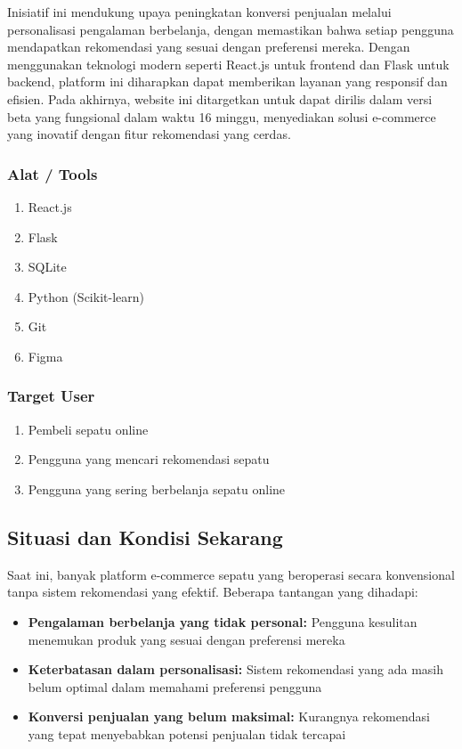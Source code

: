 \documentclass[journal,article,submit,pdftex,moreauthors]{Definitions/mdpi}
\begin{document}
Inisiatif ini mendukung upaya peningkatan konversi penjualan melalui personalisasi pengalaman berbelanja, dengan memastikan bahwa setiap pengguna mendapatkan rekomendasi yang sesuai dengan preferensi mereka. Dengan menggunakan teknologi modern seperti React.js untuk frontend dan Flask untuk backend, platform ini diharapkan dapat memberikan layanan yang responsif dan efisien. Pada akhirnya, website ini ditargetkan untuk dapat dirilis dalam versi beta yang fungsional dalam waktu 16 minggu, menyediakan solusi e-commerce yang inovatif dengan fitur rekomendasi yang cerdas.

\subsubsection{Alat / Tools}
\begin{enumerate}[left=2em]
    \item React.js
    \item Flask
    \item SQLite
    \item Python (Scikit-learn)
    \item Git
    \item Figma
\end{enumerate}

\subsubsection{Target User}
\begin{enumerate}[left=2em]
    \item Pembeli sepatu online
    \item Pengguna yang mencari rekomendasi sepatu
    \item Pengguna yang sering berbelanja sepatu online
\end{enumerate}

\subsection{Situasi dan Kondisi Sekarang}
Saat ini, banyak platform e-commerce sepatu yang beroperasi secara konvensional tanpa sistem rekomendasi yang efektif. Beberapa tantangan yang dihadapi:

\begin{itemize}[left=2em]
    \item \textbf{Pengalaman berbelanja yang tidak personal:} Pengguna kesulitan menemukan produk yang sesuai dengan preferensi mereka
    \item \textbf{Keterbatasan dalam personalisasi:} Sistem rekomendasi yang ada masih belum optimal dalam memahami preferensi pengguna
    \item \textbf{Konversi penjualan yang belum maksimal:} Kurangnya rekomendasi yang tepat menyebabkan potensi penjualan tidak tercapai
\end{itemize}
\end{document}
